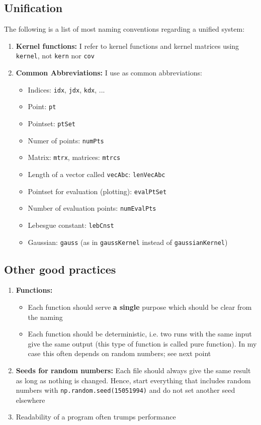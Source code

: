 \documentclass[12pt]{article}
\begin{document}
\subsection{Unification}
The following is a list of most naming conventions regarding a unified system:
\begin{enumerate}
\item \textbf{Kernel functions:} I refer to kernel functions and kernel matrices using \texttt{kernel}, not \texttt{kern} nor \texttt{cov}
\item \textbf{Common Abbreviations:} I use as common abbreviations:
\begin{itemize}
\item Indices: \texttt{idx}, \texttt{jdx}, \texttt{kdx}, ...
\item Point: \texttt{pt}
\item Pointset: \texttt{ptSet}
\item Numer of points: \texttt{numPts}
\item Matrix: \texttt{mtrx}, matrices: \texttt{mtrcs}
\item Length of a vector called \texttt{vecAbc}: \texttt{lenVecAbc}
\item Pointset for evaluation (plotting): \texttt{evalPtSet}
\item Number of evaluation points: \texttt{numEvalPts}
\item Lebesgue constant: \texttt{lebCnst}
\item Gaussian: \texttt{gauss} (as in \texttt{gaussKernel} instead of \texttt{gaussianKernel})
\end{itemize}
\end{enumerate}




\subsection{Other good practices}
\begin{enumerate}
\item \textbf{Functions:}
\begin{itemize}
\item Each function should serve \textbf{a single} purpose which should be clear from the naming
\item Each function should be deterministic, i.e. two runs with the same input give the same output (this type of function is called pure function). In my case this often depends on random numbers; see next point
\end{itemize}
\item \textbf{Seeds for random numbers:} Each file should always give the same result as long as nothing is changed. Hence, start everything that includes random numbers with \texttt{np.random.seed(15051994)} and do not set another seed elsewhere
\item Readability of a program often trumps performance
\end{enumerate}
\end{document}
